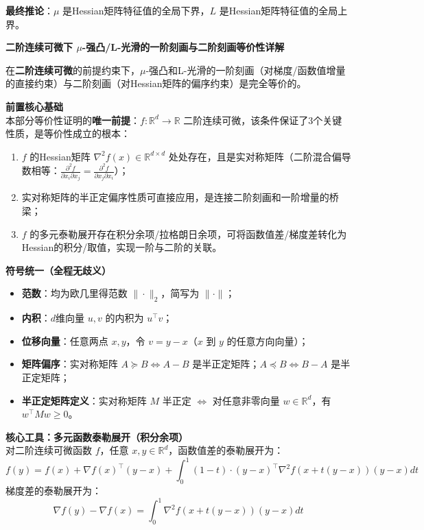 \documentclass[10pt]{article}
\numberwithin{equation}{section}
\theoremstyle{plain}
\theoremstyle{definition}
\theoremstyle{remark}
\begin{document}
\textbf{最终推论}：$\mu$ 是Hessian矩阵特征值的全局下界，$L$ 是Hessian矩阵特征值的全局上界。

{\par\vspace{0.8ex}\noindent\normalsize\bfseries\color{secblue} 二阶连续可微下 $\mu$-强凸/L-光滑的一阶刻画与二阶刻画等价性详解\par}
在\textbf{二阶连续可微}的前提约束下，$\mu$-强凸和L-光滑的一阶刻画（对梯度/函数值增量的直接约束）与二阶刻画（对Hessian矩阵的偏序约束）是完全等价的。

\textbf{前置核心基础}\\
本部分等价性证明的\textbf{唯一前提}：$f:\mathbb{R}^d \to \mathbb{R}$ 二阶连续可微，该条件保证了3个关键性质，是等价性成立的根本：
\begin{enumerate}[label=\arabic*., leftmargin=*]
    \item $f$ 的Hessian矩阵 $\nabla^2 f(x) \in \mathbb{R}^{d \times d}$ 处处存在，且是实对称矩阵（二阶混合偏导数相等：$\displaystyle \frac{\partial^2 f}{\partial x_i \partial x_j} = \frac{\partial^2 f}{\partial x_j \partial x_i}$）；
    \item 实对称矩阵的半正定偏序性质可直接应用，是连接二阶刻画和一阶增量的桥梁；
    \item $f$ 的多元泰勒展开存在积分余项/拉格朗日余项，可将函数值差/梯度差转化为Hessian的积分/取值，实现一阶与二阶的关联。
\end{enumerate}

\textbf{符号统一（全程无歧义）}
\begin{itemize}[leftmargin=*,nosep]
    \item \textbf{范数}：均为欧几里得范数 $\| \cdot \|_2$，简写为 $\| \cdot \|$；
    \item \textbf{内积}：$d$维向量 $u,v$ 的内积为 $u^\top v$；
    \item \textbf{位移向量}：任意两点 $x,y$，令 $v = y - x$（$x$ 到 $y$ 的任意方向向量）；
    \item \textbf{矩阵偏序}：实对称矩阵 $A \succeq B \iff A-B$ 是半正定矩阵；$A \preceq B \iff B-A$ 是半正定矩阵；
    \item \textbf{半正定矩阵定义}：实对称矩阵 $M$ 半正定 $\iff$ 对任意非零向量 $w \in \mathbb{R}^d$，有 $w^\top M w \ge 0$。
\end{itemize}

\textbf{核心工具：多元函数泰勒展开（积分余项）}\\
对二阶连续可微函数 $f$，任意 $x,y \in \mathbb{R}^d$，函数值差的泰勒展开为：
\[ \displaystyle f(y) = f(x) + \nabla f(x)^\top (y-x) + \int_0^1 (1-t) \cdot (y-x)^\top \nabla^2 f\left(x+t(y-x)\right) (y-x) dt \]
梯度差的泰勒展开为：
\[ \displaystyle \nabla f(y) - \nabla f(x) = \int_0^1 \nabla^2 f\left(x+t(y-x)\right) (y-x) dt \]
\end{document}
